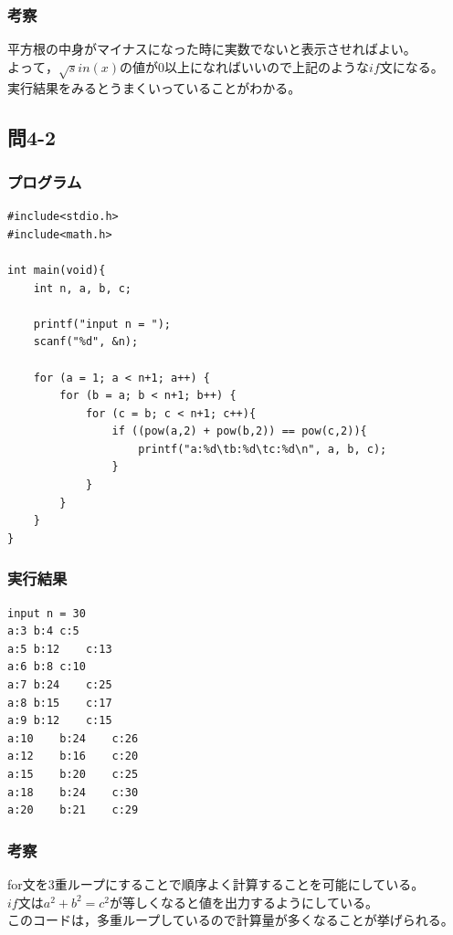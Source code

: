\documentclass{jarticle}
\begin{document}
\subsubsection{考察\\}
平方根の中身がマイナスになった時に実数でないと表示させればよい。\\
$よって，\sqrt sin(x) の値が0以上になればいいので上記のようなif文になる。$\\
実行結果をみるとうまくいっていることがわかる。\\


\subsection{問4-2\\}
\subsubsection{プログラム\\}
\begin{breakbox}
\begin{verbatim}
#include<stdio.h>
#include<math.h>

int main(void){
    int n, a, b, c;

    printf("input n = ");
    scanf("%d", &n);

    for (a = 1; a < n+1; a++) {
        for (b = a; b < n+1; b++) {
            for (c = b; c < n+1; c++){
                if ((pow(a,2) + pow(b,2)) == pow(c,2)){
                    printf("a:%d\tb:%d\tc:%d\n", a, b, c);
                }
            }
        }
    }   
}
\end{verbatim}
\end{breakbox}
\subsubsection{実行結果\\}
\begin{breakbox}
\begin{verbatim}
input n = 30
a:3	b:4	c:5
a:5	b:12	c:13
a:6	b:8	c:10
a:7	b:24	c:25
a:8	b:15	c:17
a:9	b:12	c:15
a:10	b:24	c:26
a:12	b:16	c:20
a:15	b:20	c:25
a:18	b:24	c:30
a:20	b:21	c:29
\end{verbatim}
\end{breakbox}
\subsubsection{考察\\}
for文を3重ループにすることで順序よく計算することを可能にしている。\\
$if文はa^2+b^2 = c^2が等しくなると値を出力するようにしている。$\\
このコードは，多重ループしているので計算量が多くなることが挙げられる。\\
\end{document}
